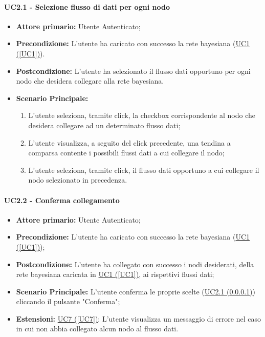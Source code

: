 \paragraph{UC2.1 - Selezione flusso di dati per ogni nodo}\label{UC2.1}
\begin{itemize}
\item \textbf{Attore primario:} Utente Autenticato;
\item \textbf{Precondizione:} L'utente ha caricato con successo la rete bayesiana (\hyperref[UC1]{UC1 (\ref*{UC1})}).
\item \textbf{Postcondizione:} L'utente ha selezionato il flusso dati opportuno per ogni nodo che desidera collegare alla rete bayesiana.
\item \textbf{Scenario Principale:}
 \begin{enumerate}
 \item L'utente seleziona, tramite click, la checkbox corrispondente al nodo che desidera collegare ad un determinato flusso dati;
 \item L'utente visualizza, a seguito del click precedente, una tendina a comparsa contente i possibili flussi dati a cui collegare il nodo;
 \item L'utente seleziona, tramite click, il flusso dati opportuno a cui collegare il nodo selezionato in precedenza.
 \end{enumerate}
\end{itemize}

\paragraph{UC2.2 - Conferma collegamento}\label{UC2.2}
\begin{itemize}
\item \textbf{Attore primario:} Utente Autenticato;
\item \textbf{Precondizione:} L'utente ha caricato con successo la rete bayesiana (\hyperref[UC1]{UC1 (\ref*{UC1})});
\item \textbf{Postcondizione:} L'utente ha collegato con successo i nodi desiderati, della rete bayesiana caricata in \hyperref[UC1]{UC1 (\ref*{UC1})}, ai rispettivi flussi dati;
\item \textbf{Scenario Principale:} L'utente conferma le proprie scelte (\hyperref[UC2.1]{UC2.1 (\ref*{UC2.1})}) cliccando il pulsante "Conferma";
\item \textbf{Estensioni:} \hyperref[UC7]{UC7 (\ref*{UC7})}: L'utente visualizza un messaggio di errore nel caso in cui non abbia collegato alcun nodo al flusso dati.
\end{itemize}
\newpage

